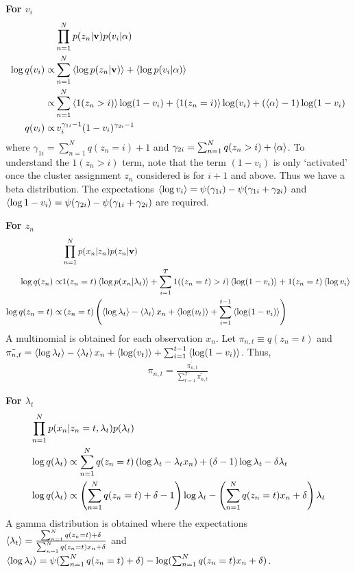 \documentclass{article}
\begin{document}
\textbf{For $v_i $}
\begin{align}
\nonumber& \prod_{n=1}^{N}p(z_n|\mathbf{v})p(v_i|\alpha)\\
\nonumber \log q(v_i)\propto & \sum_{n=1}^{N} \left\langle\log p(z_n|\mathbf{v})\right\rangle+\left\langle\log p(v_i|\alpha)\right\rangle\\
\nonumber \propto&\sum_{n=1}^{N}\left\langle1(z_n>i)\right\rangle\log(1-v_i)+\left\langle1(z_n=i)\right\rangle\log(v_i)+(\left\langle\alpha\right\rangle-1)\log (1-v_i)\\
q(v_i) \propto & \,v_i^{\gamma_{1i}-1}(1-v_i)^{\gamma_{2i}-1}
\end{align}
where $\gamma_{1i}=\sum_{n=1}^{N} q(z_n=i)+1$ and $\gamma_{2i}=\sum_{n=1}^{N} q(z_n>i)+\left\langle\alpha\right\rangle$. To understand the $1(z_n>i)$ term, note that the term $(1-v_i)$ is only `activated' once the cluster assignment $z_n$ considered is for $i+1$ and above. Thus we have a beta distribution. The expectations $\left\langle\log v_i\right\rangle=\psi(\gamma_{1i})-\psi(\gamma_{1i}+\gamma_{2i})$ and $\left\langle\log 1-v_i\right\rangle=\psi(\gamma_{2i})-\psi(\gamma_{1i}+\gamma_{2i})$ are required.

\textbf{For $z_n$}
\begin{align}
\nonumber&\prod_{n=1}^{N} p(x_n|z_n)p(z_n|\mathbf{v})\\
\nonumber\log q(z_n)\propto & 1(z_n=t)\left\langle\log p(x_n|\lambda_t)\right\rangle+\sum_{i=1}^{T} 1((z_n=t)>i)\left\langle\log(1-v_i)\right\rangle+1(z_n=t)\left\langle\log v_i\right\rangle\\
\log q(z_n=t)\propto &\left(z_n=t\right)\left(\left\langle\log \lambda_t\right\rangle-\left\langle\lambda_t\right\rangle x_n+\left\langle\log(v_t)\right\rangle+\sum_{i=1}^{t-1}\left\langle\log(1-v_i)\right\rangle\right)
\end{align}
A multinomial is obtained for each observation $x_n$. Let $\pi_{n,t}\equiv q(z_n=t)$ and $\tilde{\pi_{n,t}}=\left\langle\log \lambda_t\right\rangle-\left\langle\lambda_t\right\rangle x_n+\left\langle\log(v_t)\right\rangle+\sum_{i=1}^{t-1}\left\langle\log(1-v_i)\right\rangle$. Thus,
\begin{align}
\pi_{n,t}=\frac{\tilde{\pi_{n,t}}}{\sum_{t=1}^{T}\tilde{\pi_{n,t}}}
\end{align}

\textbf{For $\lambda_t$}
\begin{align}
\nonumber & \prod_{n=1}^{N}p(x_n|z_n=t,\lambda_t) p(\lambda_t)\\
\nonumber & \log q(\lambda_t) \propto \sum_{n=1}^{N}q(z_n=t)\left(\log\lambda_t-\lambda_t x_n\right)+(\delta-1)\log\lambda_t-\delta\lambda_t\\
& \log q(\lambda_t) \propto \left(\sum_{n=1}^{N} q(z_n=t) +\delta -1\right)\log\lambda_t-\left(\sum_{n=1}^{N} q(z_n=t)x_n+\delta\right)\lambda_t
\end{align}
A gamma distribution is obtained where the expectations $\left\langle\lambda_t\right\rangle=\frac{\sum_{n=1}^{N} q(z_n=t) +\delta}{\sum_{n=1}^{N} q(z_n=t)x_n+\delta}$ and $\left\langle\log\lambda_t\right\rangle=\psi(\sum_{n=1}^{N} q(z_n=t) +\delta)-\log(\sum_{n=1}^{N} q(z_n=t)x_n+\delta)$.
\end{document}
